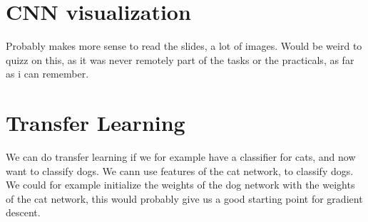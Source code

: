 \documentclass[a4paper]{article}
\begin{document}
\section{CNN visualization}
Probably makes more sense to read the slides, a lot of images. Would be weird to quizz on this, as it was never remotely part of the tasks or the practicals, as far as i can remember. 

\section{Transfer Learning}
We can do transfer learning if we for example have a classifier for cats, and now want to classify dogs. We cann use features of the cat network, to classify dogs. We could for example initialize the weights of the dog network with the weights of the cat network, this would probably give us a good starting point for gradient descent. 
\end{document}
